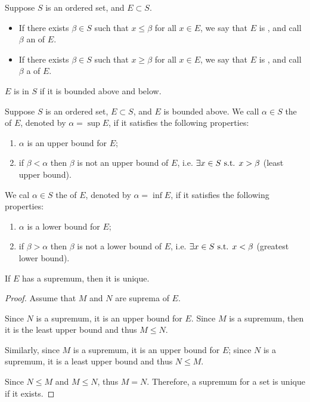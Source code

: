 \begin{definition}[Boundedness]
Suppose $S$ is an ordered set, and $E\subset S$.
\begin{itemize}
\item If there exists $\beta\in S$ such that $x\le\beta$ for all $x\in E$, we say that $E$ is , and call $\beta$ an  of $E$.
\item If there exists $\beta\in S$ such that $x\ge\beta$ for all $x\in E$, we say that $E$ is , and call $\beta$ a  of $E$.
\end{itemize}
$E$ is  in $S$ if it is bounded above and below.
\end{definition}

\begin{definition}[Supremum]
Suppose $S$ is an ordered set, $E\subset S$, and $E$ is bounded above. We call $\alpha\in S$ the  of $E$, denoted by $\alpha=\sup E$, if it satisfies the following properties:
\begin{enumerate}[label=(\roman*)]
\item $\alpha$ is an upper bound for $E$;
\item if $\beta<\alpha$ then $\beta$ is not an upper bound of $E$, i.e. $\exists x\in S\text{ s.t. } x>\beta$ (least upper bound).
\end{enumerate}
\end{definition}

\begin{definition}[Infimum]
We cal $\alpha\in S$ the  of $E$, denoted by $\alpha=\inf E$, if it satisfies the following properties:
\begin{enumerate}[label=(\roman*)]
\item $\alpha$ is a lower bound for $E$;
\item if $\beta>\alpha$ then $\beta$ is not a lower bound of $E$, i.e. $\exists x\in S\text{ s.t. } x<\beta$ (greatest lower bound).
\end{enumerate}
\end{definition}

\begin{proposition}
If $E$ has a supremum, then it is unique.
\end{proposition}

\begin{proof}
Assume that $M$ and $N$ are suprema of $E$.

Since $N$ is a supremum, it is an upper bound for $E$. Since $M$ is a supremum, then it is the least upper bound and thus $M \le N$. 

Similarly, since $M$ is a supremum, it is an upper bound for $E$; since $N$ is a supremum, it is a least upper bound and thus $N \le M$.

Since $N \le M$ and $M \le N$, thus $M=N$. Therefore, a supremum for a set is unique if it exists.
\end{proof}

